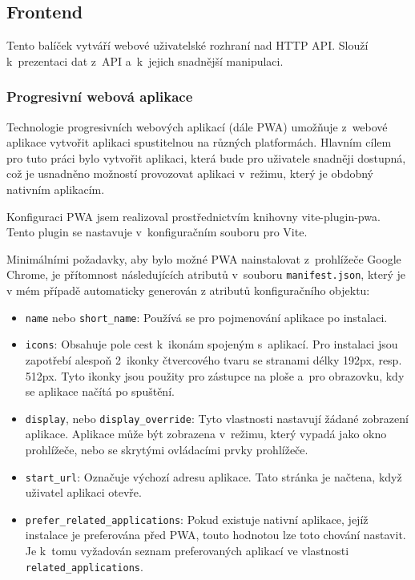 \documentclass[
  tables=false,
  glossaries,
  index
]{kidiplom}
\begin{document}
\subsection{Frontend}
Tento balíček vytváří webové uživatelské rozhraní nad HTTP API. Slouží k~prezentaci dat z~API a~k~jejich snadnější manipulaci.

\subsubsection{Progresivní webová aplikace}
Technologie progresivních webových aplikací (dále PWA) umožňuje z~webové aplikace vytvořit aplikaci spustitelnou na různých platformách. Hlavním cílem pro tuto práci bylo vytvořit aplikaci, která bude pro uživatele snadněji dostupná, což je usnadněno možností provozovat aplikaci v~režimu, který je obdobný nativním aplikacím.

Konfiguraci PWA jsem realizoval prostřednictvím knihovny vite-plugin-pwa\cite{vite-plugin-pwa}. Tento plugin se nastavuje v~konfiguračním souboru pro Vite.

Minimálními požadavky\cite{pwa-installation}, aby bylo možné PWA nainstalovat z~prohlížeče Google Chrome, je přítomnost následujících atributů v~souboru \texttt{manifest.json}, který je v mém případě automaticky generován z atributů konfiguračního objektu:
\begin{itemize}
	\item \texttt{name} nebo \texttt{short\_name}: Používá se pro pojmenování aplikace po instalaci.
	\item \texttt{icons}: Obsahuje pole cest k~ikonám spojeným s~aplikací. Pro instalaci jsou zapotřebí alespoň 2~ikonky čtvercového tvaru se stranami délky 192px, resp. 512px. Tyto ikonky jsou použity pro zástupce na ploše a~pro obrazovku, kdy se aplikace načítá po spuštění.
	\item \texttt{display}, nebo \texttt{display\_override}: Tyto vlastnosti nastavují žádané zobrazení aplikace. Aplikace může být zobrazena v~režimu, který vypadá jako okno prohlížeče, nebo se skrytými ovládacími prvky prohlížeče.
	\item \texttt{start\_url}: Označuje výchozí adresu aplikace. Tato stránka je načtena, když uživatel aplikaci otevře.
	\item \texttt{prefer\_related\_applications}: Pokud existuje nativní aplikace, jejíž instalace je preferována před PWA, touto hodnotou lze toto chování nastavit. Je k~tomu vyžadován seznam preferovaných aplikací ve vlastnosti \texttt{related\_applications}.
\end{itemize}
\end{document}
